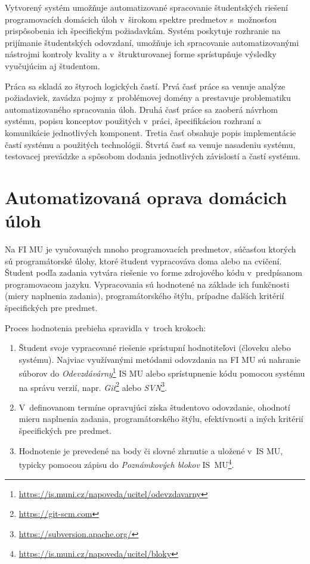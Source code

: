 \documentclass[
  digital, %
  oneside, %
  table,   %
  lof,     %
  lot,   %
]{fithesis3}
\newcommand*{\footurl}[1]{\footnote{\url{#1}}}
\begin{document}
Vytvorený systém umožňuje automatizované spracovanie študentských riešení programovacích domácich úloh v~širokom spektre predmetov s~možnosťou prispôsobenia ich špecifickým požiadavkám. Systém poskytuje rozhranie na prijímanie študentských odovzdaní, umožňuje ich spracovanie automatizovanými nástrojmi kontroly kvality a v~štrukturovanej forme sprístupňuje výsledky vyučujúcim aj študentom.

Práca sa skladá zo štyroch logických častí. Prvá časť práce sa venuje analýze požiadaviek, zavádza pojmy z~problémovej domény a prestavuje problematiku automatizovaného spracovania úloh. Druhá časť práce sa zaoberá návrhom systému, popisu konceptov použitých v~práci, špecifikáciou rozhraní a komunikácie jednotlivých komponent. Tretia časť obsahuje popis implementácie častí systému a použitých technológii. Štvrtá časť sa venuje nasadeniu systému, testovacej prevádzke a spôsobom dodania jednotlivých závislostí a častí systému. 


\chapter{Automatizovaná oprava domácich úloh}

Na FI MU je vyučovaných mnoho programovacích predmetov, súčasťou ktorých sú programátorské úlohy, ktoré študent vypracováva doma alebo na cvičení. Študent podľa zadania vytvára riešenie vo forme zdrojového kódu v~predpísanom programovacom jazyku. Vypracovania sú hodnotené na základe ich funkčnosti (miery naplnenia zadania), programátorského štýlu, prípadne ďalších kritérií špecifických pre predmet. 

Proces hodnotenia prebieha spravidla v~troch krokoch:
\begin{enumerate}
    \item Študent svoje vypracované riešenie sprístupní hodnotiteľovi (človeku alebo systému). Najviac využívanými metódami odovzdania na FI MU sú nahranie súborov do \textit{Odevzdávárny}\footurl{https://is.muni.cz/napoveda/ucitel/odevzdavarny} IS MU alebo sprístupnenie kódu pomocou systému na správu verzií, napr. \textit{Git}\footurl{https://git-scm.com} alebo \textit{SVN}\footurl{https://subversion.apache.org/}. 
    \item V~definovanom termíne opravujúci získa študentovo odovzdanie, ohodnotí mieru naplnenia zadania, programátorského štýlu, efektívnosti a iných kritérií špecifických pre predmet. 
    \item Hodnotenie je prevedené na body či slovné zhrnutie a uložené v~IS MU, typicky pomocou zápisu do \emph{Poznámkových blokov} IS~MU\footurl{https://is.muni.cz/napoveda/ucitel/bloky}.
\end{enumerate}
\end{document}
